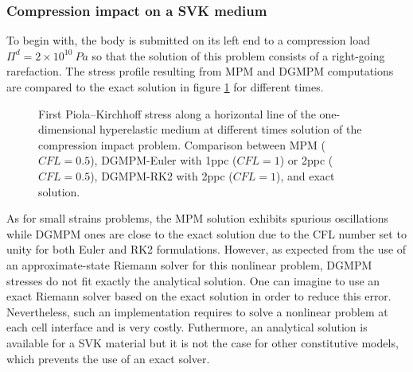 \subsubsection{Compression impact on a SVK medium}
To begin with, the body is submitted on its left end to a compression load $\Pi^d= 2\times 10^{10} \: Pa$ so that the solution of this problem consists of a right-going rarefaction. The stress profile resulting from MPM and DGMPM computations are compared to the exact solution in figure \ref{fig:he_rarefaction} for different times. %
\begin{figure}[h!]
  \centering
  {}
  \caption{First Piola–Kirchhoff stress along a horizontal line of the one-dimensional hyperelastic medium at different times solution of the compression impact problem. Comparison between MPM ($CFL=0.5$), DGMPM-Euler with 1ppc ($CFL=1$) or 2ppc ($CFL=0.5$), DGMPM-RK2 with 2ppc ($CFL=1$), and exact solution.}
  \label{fig:he_rarefaction}
\end{figure}
As for small strains problems, the MPM solution exhibits spurious oscillations while DGMPM ones are close to the exact solution due to the CFL number set to unity for both Euler and RK2 formulations.
However, as expected from the use of an approximate-state Riemann solver for this nonlinear problem, DGMPM stresses do not fit exactly the analytical solution. One can imagine to use an exact Riemann solver based on the exact solution in order to reduce this error. Nevertheless, such an implementation requires to solve a nonlinear problem at each cell interface and is very costly. Futhermore, an analytical solution is available for a SVK material but it is not the case for other constitutive models, which prevents the use of an exact solver.

